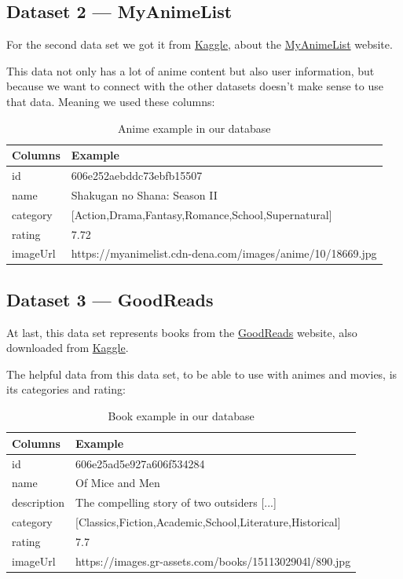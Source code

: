 \documentclass{article}
\newcommand*\fpar{\hspace{1ex}}
\begin{document}
  \subsection{Dataset 2 — MyAnimeList}
  \label{sec:animes}
  \fpar For the second data set we got it from \href{https://www.kaggle.com/azathoth42/myanimelist}{Kaggle}, about the \href{https://myanimelist.net/}{MyAnimeList} website.
  \par This data not only has a lot of anime content but also user information, but because we want to connect with the other datasets doesn't make sense to use that data. Meaning we used these columns:
  \begin{table}[H]
    \centering
    \begin{tabular}{l|l}
      Columns & Example                       \\ \hline
      id      & 606e252aebddc73ebfb15507      \\
      name    & Shakugan no Shana: Season II  \\
      category& [Action,Drama,Fantasy,Romance,School,Supernatural]  \\
      rating  & 7.72                          \\
      imageUrl& https://myanimelist.cdn-dena.com/images/anime/10/18669.jpg
    \end{tabular}
    \caption{Anime example in our database}
    \label{table:anime}
  \end{table}

  \subsection{Dataset 3 — GoodReads}
  \label{sec:books}
  \fpar At last, this data set represents books from the \href{https://www.goodreads.com/}{GoodReads} website, also downloaded from \href{https://www.kaggle.com/meetnaren/goodreads-best-books}{Kaggle}.
  \par The helpful data from this data set, to be able to use with animes and movies, is its categories and rating:
  \begin{table}[H]
    \centering
    \begin{tabular}{l|l}
      Columns & Example                       \\ \hline
      id      & 606e25ad5e927a606f534284      \\
      name    & Of Mice and Men               \\
      description & The compelling story of two outsiders [...]           \\
      category& [Classics,Fiction,Academic,School,Literature,Historical]  \\
      rating  & 7.7                           \\
      imageUrl& https://images.gr-assets.com/books/1511302904l/890.jpg
    \end{tabular}
    \caption{Book example in our database}
    \label{table:book}
  \end{table}
\end{document}
